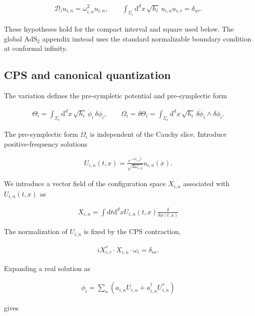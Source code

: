 \begin{align}
\mathcal D_i u_{i,n}=\omega_{i,n}^2u_{i,n},
\qquad
\int_{\Sigma_i}\mathrm d^d x\,\sqrt{h_i}\,
u_{i,n}u_{i,r}=\delta_{nr}.
\end{align}

These hypotheses hold for the compact interval and square used below. The global $\mathrm{AdS}_2$ appendix instead uses the standard normalizable boundary condition at conformal infinity.

\subsection{CPS and canonical quantization}\label{subsec:regional-cps-quantization}

The variation defines the pre-sympletic potential and pre-symplectic form

\begin{align}
\Theta_i
=\int_{\Sigma_i}\mathrm d^d x\,\sqrt{h_i}\,
\dot\phi_i\,\delta\phi_i,
\qquad
\Omega_i=\delta\Theta_i
=\int_{\Sigma_i}\mathrm d^d x\,\sqrt{h_i}\,
\delta\dot\phi_i\wedge\delta\phi_i.
\end{align}

The pre-symplectic form $\Omega_i$ is independent of the Cauchy slice. Introduce positive-frequency solutions

\begin{align}
U_{i,n}(t,x)
=\frac{e^{-i\omega_{i,n}t}}{\sqrt{2\omega_{i,n}}}
u_{i,n}(x).
\end{align}

We introduce a vector field of the configuration space $X_{i,n}$ associated with $U_{i,n}(t,x)$ as

\begin{align}
X_{i,n}=\int \mathrm{d}t\mathrm{d}^{d}x U_{i,n}(t,x) \frac{\delta}{\delta \phi(t,x)}
\end{align}

The normalization of $U_{i,n}$ is fixed by the CPS contraction,

\begin{align}
iX_{i,r}^*\mathbin{\cdot}X_{i,n}\mathbin{\cdot}\omega_i
=\delta_{nr}.
\end{align}

Expanding a real solution as

\begin{align}
\phi_i
=\sum_n\left(a_{i,n}U_{i,n}+a_{i,n}^\dagger U_{i,n}^*\right)
\end{align}

gives


